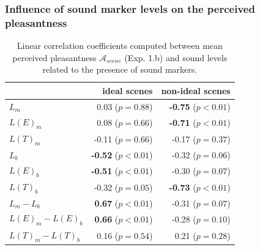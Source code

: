 \documentclass[12pt]{elsarticle}
\begin{document}
\subsubsection*{Influence of sound marker levels on the perceived pleasantness}

\begin{table}[t]
\setlength{\tabcolsep}{3pt}
\centering
{\renewcommand{\arraystretch}{1}
\centering
\begin{tabular}{l r r}
                   &   ideal scenes             & non-ideal scenes \\
\hline
$L_m$              & 0.03  ($p=0.88$)           & \textbf{-0.75} ($p<0.01$) \\
$L(E)_m$           & 0.08  ($p=0.66$)           & \textbf{-0.71} ($p<0.01$) \\
$L(T)_m$           & -0.11 ($p=0.66$)           & -0.17 ($p=0.37$) \\
$L_b$              & \textbf{-0.52} ($p<0.01$)  & -0.32 ($p=0.06$) \\
$L(E)_b$           & \textbf{-0.51} ($p<0.01$)  & -0.30 ($p=0.07$) \\
$L(T)_b$           & -0.32 ($p=0.05$)           & \textbf{-0.73} ($p<0.01$) \\
$L_m-L_b$          & \textbf{0.67} ($p<0.01$)   & -0.31 ($p=0.07$) \\
$L(E)_m-L(E)_b$    & \textbf{0.66} ($p<0.01$)   & -0.28 ($p=0.10$) \\
$L(T)_m-L(T)_b$    & 0.16 ($p=0.54$)            & 0.21 ($p=0.28$) \\
\hline
\end{tabular}
}
\vspace{0.5mm}
\caption{Linear correlation coefficients computed between mean perceived pleasantness $\mathcal{A}_{scene}$ (Exp. 1.b) and sound levels related to the presence of sound markers.}
\label{tab:corrMarkers}
\end{table}
\end{document}

